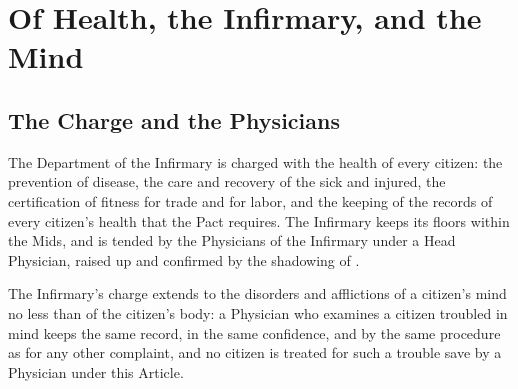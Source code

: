 \chapter{Of Health, the Infirmary, and the Mind}
\label{art:health}


\section{The Charge and the Physicians}
\label{sec:health:charge-and-the-physicians}

The Department of the Infirmary is charged with the health of every citizen: the prevention of disease, the care and recovery of the sick and injured, the certification of fitness for trade and for labor, and the keeping of the records of every citizen's health that the Pact requires. The Infirmary keeps its floors within the Mids, and is tended by the Physicians of the Infirmary under a Head Physician, raised up and confirmed by the shadowing of .

The Infirmary's charge extends to the disorders and afflictions of a citizen's mind no less than of the citizen's body: a Physician who examines a citizen troubled in mind keeps the same record, in the same confidence, and by the same procedure as for any other complaint, and no citizen is treated for such a trouble save by a Physician under this Article.

